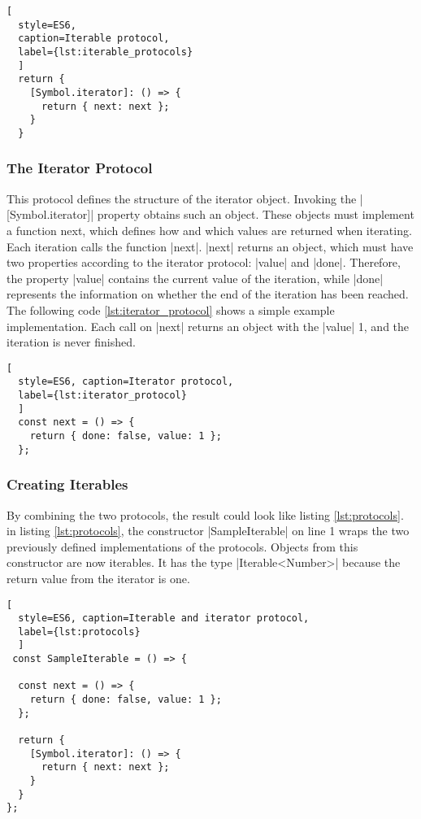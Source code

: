 \begin{lstlisting}[
  style=ES6, 
  caption=Iterable protocol,
  label={lst:iterable_protocols}
  ]
  return {
    [Symbol.iterator]: () => {
      return { next: next };
    }
  }
\end{lstlisting}

\subsubsection{The Iterator Protocol}
\label{subsub:The Iterator Protocol}
This protocol defines the structure of the iterator object. Invoking the 
|[Symbol.iterator]| property obtains such an object. These objects must 
implement a function next, which defines how and which values are returned 
when iterating.
Each iteration calls the function |next|. |next| returns an object, which must
have two properties according to the iterator protocol: |value| and |done|.
Therefore, the property |value| contains the current value of the iteration,
while |done| represents the information on whether the end of the iteration has 
been reached. The following code \ref{lst:iterator_protocol} shows a simple 
example implementation. Each call on |next| returns an object with the |value| 
1, and the iteration is never finished. 

\begin{lstlisting}[
  style=ES6, caption=Iterator protocol,
  label={lst:iterator_protocol}
  ]
  const next = () => {
    return { done: false, value: 1 };
  };
\end{lstlisting}

\subsubsection{Creating Iterables}
\label{subsub:Creating Iterables}
By combining the two protocols, the result could look like listing
\ref{lst:protocols}. in listing \ref{lst:protocols}, the constructor 
|SampleIterable| on line 1 wraps the two previously
defined implementations of the protocols. Objects from this constructor are now
iterables. It has the type |Iterable<Number>| because the return value from the
iterator is one.

\begin{lstlisting}[
  style=ES6, caption=Iterable and iterator protocol,
  label={lst:protocols}
  ]
 const SampleIterable = () => {

  const next = () => {
    return { done: false, value: 1 };
  };

  return {
    [Symbol.iterator]: () => {
      return { next: next };
    }
  }
};
\end{lstlisting}

